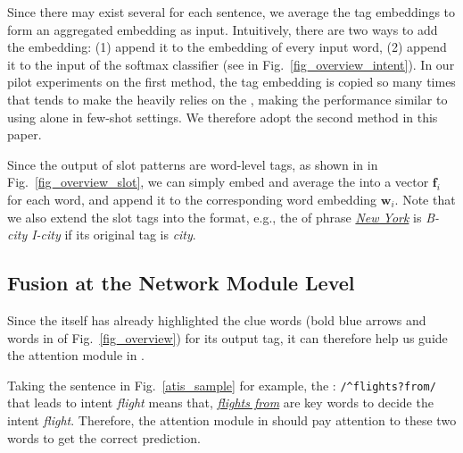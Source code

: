 Since there may exist several \REtags for each sentence, we average the tag embeddings to form an aggregated embedding as input.
Intuitively, there are two ways to add the embedding: (1) append it to the embedding of every input word, (2) append it to the input of the softmax classifier (see  in Fig.~\ref{fig_overview_intent}).
In our pilot experiments on the first method, the tag embedding is copied so many times that tends to make the \NN heavily relies on the \REtags, making the performance similar to using \RE alone in few-shot settings. We therefore adopt the second method in this paper.

Since the output of slot \RE patterns are word-level tags, as shown in  in Fig.~\ref{fig_overview_slot}, we can simply embed
and average the \REtags into a vector $\textbf{f}_i$ for each word, and append it to the corresponding word embedding $\textbf{w}_i$.
Note that we also extend the slot \RE tags into the \BIO format, e.g.,
the \REtag of phrase \textsl{\underline{New York}} is \emph{B-city I-city} if its original tag is \emph{city}.

\subsection{Fusion at the Network Module Level}
\label{interact_with_module}
Since the \RE itself has already highlighted the clue words (bold blue arrows and words in  of Fig.~\ref{fig_overview}) for its output tag, it can therefore help us guide the attention module in \NN.

Taking the sentence in Fig.~\ref{atis_sample} for example, the \RE: {\small\texttt{/\textasciicircum flights?\:from/} } that leads to intent \emph{flight} means that, \textsl{\underline{flights from}} are key words to decide the intent \emph{flight}. Therefore, the attention module in \NN should pay attention to these two words to get the correct prediction.


